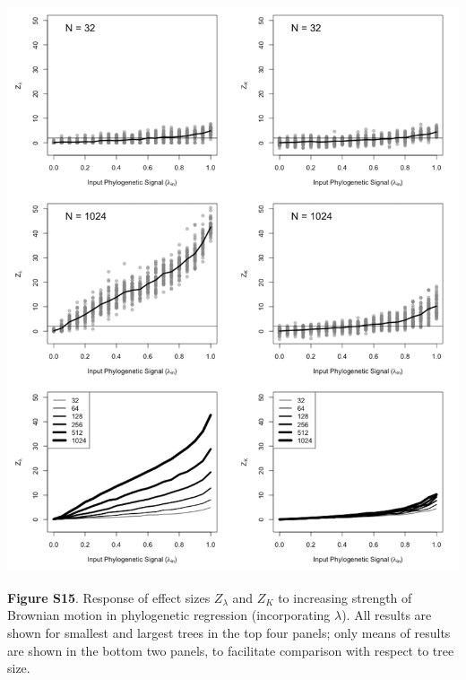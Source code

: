 \documentclass[
]{article}
\begin{document}
\includegraphics[width=0.95\linewidth]{fig.S15}

\textbf{Figure S15}. Response of effect sizes \(Z_{\lambda}\) and
\(Z_K\) to increasing strength of Brownian motion in phylogenetic
regression (incorporating \(\lambda\)). All results are shown for
smallest and largest trees in the top four panels; only means of results
are shown in the bottom two panels, to facilitate comparison with
respect to tree size.
\end{document}

